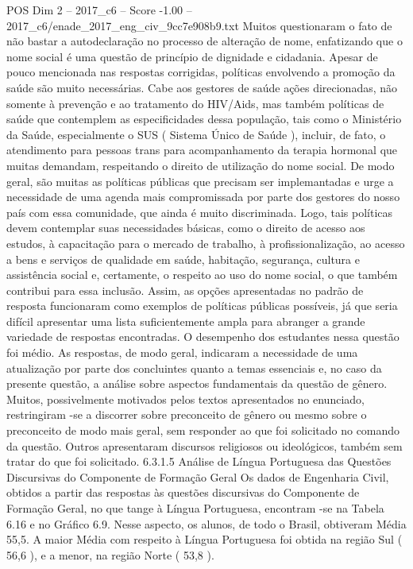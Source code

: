 \begin{textsample}{POS Dim 2 – 2017\_c6 – Score -1.00 – 2017\_c6/enade\_2017\_eng\_civ\_9cc7e908b9.txt}
Muitos questionaram o fato de não bastar a autodeclaração no processo de alteração de nome, enfatizando que o nome social é uma questão de princípio de dignidade e cidadania.
Apesar de pouco mencionada nas respostas corrigidas, políticas envolvendo a promoção da saúde são muito necessárias.
Cabe aos gestores de saúde ações direcionadas, não somente à prevenção e ao tratamento do HIV/Aids, mas também políticas de saúde que contemplem as especificidades dessa população, tais como o Ministério da Saúde, especialmente o SUS ( Sistema Único de Saúde ), incluir, de fato, o atendimento para pessoas trans para acompanhamento da terapia hormonal que muitas demandam, respeitando o direito de utilização do nome social.
De modo geral, são muitas as políticas públicas que precisam ser implemantadas e urge a necessidade de uma agenda mais compromissada por parte dos gestores do nosso país com essa comunidade, que ainda é muito discriminada.
Logo, tais políticas devem contemplar suas necessidades básicas, como o direito de acesso aos estudos, à capacitação para o mercado de trabalho, à profissionalização, ao acesso a bens e serviços de qualidade em saúde, habitação, segurança, cultura e assistência social e, certamente, o respeito ao uso do nome social, o que também contribui para essa inclusão.
Assim, as opções apresentadas no padrão de resposta funcionaram como exemplos de políticas públicas possíveis, já que seria difícil apresentar uma lista suficientemente ampla para abranger a grande variedade de respostas encontradas.
O desempenho dos estudantes nessa questão foi médio.
As respostas, de modo geral, indicaram a necessidade de uma atualização por parte dos concluintes quanto a temas essenciais e, no caso da presente questão, a análise sobre aspectos fundamentais da questão de gênero.
Muitos, possivelmente motivados pelos textos apresentados no enunciado, restringiram -se a discorrer sobre preconceito de gênero ou mesmo sobre o preconceito de modo mais geral, sem responder ao que foi solicitado no comando da questão.
Outros apresentaram discursos religiosos ou ideológicos, também sem tratar do que foi solicitado. 6.3.1.5 Análise de Língua Portuguesa das Questões Discursivas do Componente de Formação Geral Os dados de Engenharia Civil, obtidos a partir das respostas às questões discursivas do Componente de Formação Geral, no que tange à Língua Portuguesa, encontram -se na Tabela 6.16 e no Gráfico 6.9.
Nesse aspecto, os alunos, de todo o Brasil, obtiveram Média 55,5.
A maior Média com respeito à Língua Portuguesa foi obtida na região Sul ( 56,6 ), e a menor, na região Norte ( 53,8 ).

\end{textsample}
